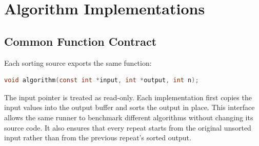 \documentclass[12pt,a4paper,oneside]{report}
\begin{document}
\chapter{Algorithm Implementations}
\section{Common Function Contract}
Each sorting source exports the same function:
\begin{lstlisting}[language=C]
void algorithm(const int *input, int *output, int n);
\end{lstlisting}
The input pointer is treated as read-only. Each implementation first copies the input values into the output buffer and sorts the output in place. This interface allows the same runner to benchmark different algorithms without changing its source code. It also ensures that every repeat starts from the original unsorted input rather than from the previous repeat's sorted output.
\end{document}
